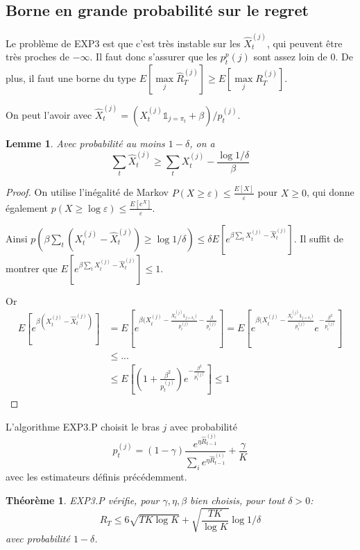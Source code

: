 \documentclass{article}
\newtheorem{theorem}{Théorème}[section]
\newtheorem{lemma}{Lemme}[section]
\theoremstyle{remark}
\theoremstyle{remark}
\begin{document}
\subsection{Borne en grande probabilité sur le regret}
Le problème de EXP3 est que c'est très instable sur les $\hat{X}_t^{(j)}$, qui peuvent être très proches de $-\infty$. Il faut donc s'assurer que les $p_t^p{(j)}$ sont assez loin de $0$. De plus, il faut une borne du type $E[\max\limits_j \hat{R}_T^{(j)}]\ge E[\max\limits_j R_T^{(j)}]$.

On peut l'avoir avec $\hat{X}_t^{(j)}=(X_t^{(j)}\mathbb{1}_{j=\pi_t}+\beta)/p_t^{(j)}$.

\begin{lemma}
Avec probabilité au moins $1-\delta$, on a
\begin{equation*}
    \sum\limits_t \hat{X}_t^{(j)} \ge \sum\limits_t X_t^{(j)} - \frac{\log{1/\delta}}{\beta}
\end{equation*}
\end{lemma}

\begin{proof}
On utilise l'inégalité de Markov $P(X\ge \varepsilon)\le \frac{E[X]}{\varepsilon}$ pour $X\ge0$, qui donne également $p(X\ge \log{\varepsilon})\le \frac{E[e^X]}{\varepsilon}$.

Ainsi $p(\beta \sum\limits_t (X_t^{(j)}-\hat{X}_t^{(j)})\ge \log{1/\delta})\le \delta E[e^{\beta \sum\limits_t X_t^{(j)}-\hat{X}_t^{(j)}}]$. Il suffit de montrer que $E[e^{\beta \sum\limits_t X_t^{(j)}-\hat{X}_t^{(j)}}]\le1$.

Or
\begin{equation*}
    \begin{aligned}
    E[e^{\beta (X_t^{(j)}-\hat{X}_t^{(j)})}] &= E[e^{\beta (X_t^{(j)}- \frac{X_t^{(j)}\mathbb{1}_{j=\pi_t})}{p_t^{(j)}}-\frac{\beta}{p_t^{(j)}}}]
    = E[e^{\beta (X_t^{(j)}- \frac{X_t^{(j)}\mathbb{1}_{j=\pi_t})}{p_t^{(j)}}} e^{-\frac{\beta^2}{p_t^{(j)}}}]\\
    &\le ...\\
    &\le E[(1+\frac{\beta^2}{p_t^{(j)}})e^{-\frac{\beta^2}{p_t^{(j)}}}] \le 1
    \end{aligned}
\end{equation*}
\end{proof}

L'algorithme EXP3.P choisit le bras $j$ avec probabilité
\begin{equation*}
    p_t^{(j)} = (1-\gamma)\frac{e^{\eta \hat{R}_{t-1}^{(j)}}}{\sum\limits_i e^{\eta \hat{R}_{t-1}^{(i)}}} + \frac{\gamma}{K}
\end{equation*}
avec les estimateurs définis précédemment.

\begin{theorem}
EXP3.P vérifie, pour $\gamma,\eta,\beta$ bien choisis, pour tout $\delta>0$:
\begin{equation*}
    R_T\le 6\sqrt{TK\log{K}} + \sqrt{\frac{TK}{\log{K}}}\log{1/\delta}
\end{equation*}
avec probabilité $1-\delta$.
\end{theorem}
\end{document}
